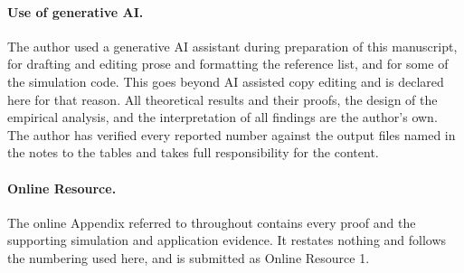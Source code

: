 \documentclass[12pt]{article}
\theoremstyle{definition}
\numberwithin{equation}{section}
\begin{document}
\paragraph{Use of generative AI.} The author used a generative AI assistant
during preparation of this manuscript, for drafting and editing prose and
formatting the reference list, and for some of the simulation code. This goes
beyond AI assisted copy editing and is declared here for that reason. All
theoretical results and their proofs, the design of the empirical analysis, and
the interpretation of all findings are the author's own. The author has verified
every reported number against the output files named in the notes to the tables
and takes full responsibility for the content.

\paragraph{Online Resource.} The online Appendix referred to throughout
contains every proof and the supporting simulation and application evidence. It
restates nothing and follows the numbering used here, and is submitted as
Online Resource 1.
\end{document}
